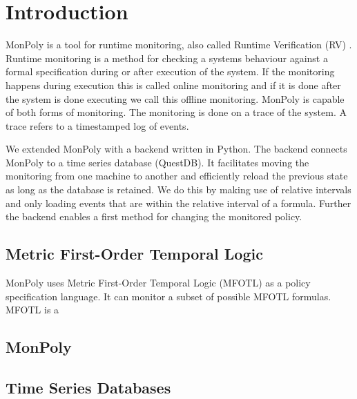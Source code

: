 \section{Introduction}

MonPoly \cite{Basin2017} is a tool for runtime monitoring, also called Runtime Verification (RV) \cite{Bartocci2018}.
Runtime monitoring is a method for checking a systems behaviour against a formal specification during or after execution of the system.
If the monitoring happens during execution this is called online monitoring and if it is done after the system is done executing we call this offline monitoring.
MonPoly is capable of both forms of monitoring.
The monitoring is done on a trace of the system.
A trace refers to a timestamped log of events.


We extended MonPoly with a backend written in Python. The backend connects MonPoly to a time series database (QuestDB).
It facilitates moving the monitoring from one machine to another and efficiently reload the previous state as long as the database is retained. 
We do this by making use of relative intervals and only loading events that are within the relative interval of a formula.
Further the backend enables a first method for changing the monitored policy.




\subsection{Metric First-Order Temporal Logic}
MonPoly uses Metric First-Order Temporal Logic (MFOTL) \cite{Basin2015, Chomicki1995} as a policy specification language. %
It can monitor a subset of possible MFOTL formulas.
MFOTL is a 

\subsection{MonPoly}

\subsection{Time Series Databases}

